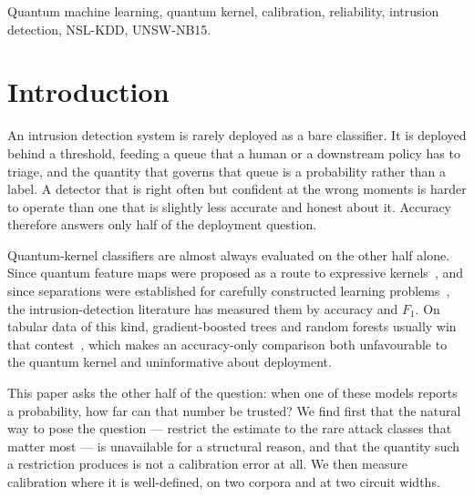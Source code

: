 \documentclass[journal]{IEEEtran}
\begin{document}
\begin{IEEEkeywords}
Quantum machine learning, quantum kernel, calibration, reliability,
intrusion detection, NSL-KDD, UNSW-NB15.
\end{IEEEkeywords}

\section{Introduction}\label{sec:intro}

An intrusion detection system is rarely deployed as a bare classifier. It is
deployed behind a threshold, feeding a queue that a human or a downstream
policy has to triage, and the quantity that governs that queue is a
probability rather than a label. A detector that is right often but confident
at the wrong moments is harder to operate than one that is slightly less
accurate and honest about it. Accuracy therefore answers only half of the
deployment question.

Quantum-kernel classifiers are almost always evaluated on the other half
alone. Since quantum feature maps were proposed as a route to expressive
kernels~\cite{havlicek2019,schuld2019hilbert}, and since separations were
established for carefully constructed learning problems~\cite{liu2021speedup},
the intrusion-detection literature has measured them by accuracy and $F_1$.
On tabular data of this kind, gradient-boosted trees and random forests
usually win that contest~\cite{grinsztajn2022tabular}, which makes an
accuracy-only comparison both unfavourable to the quantum kernel and
uninformative about deployment.

This paper asks the other half of the question: when one of these models
reports a probability, how far can that number be trusted? We find first
that the natural way to pose the question --- restrict the estimate to the
rare attack classes that matter most --- is unavailable for a structural
reason, and that the quantity such a restriction produces is not a
calibration error at all. We then measure calibration where it is
well-defined, on two corpora and at two circuit widths.
\end{document}
